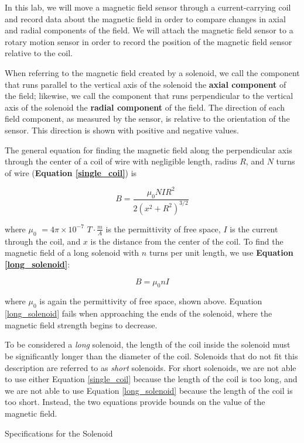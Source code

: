 In this lab, we will move a magnetic field sensor through a current-carrying coil and record data about the magnetic field in order to compare changes in axial and radial components of the field. We will attach the magnetic field sensor to a rotary motion sensor in order to record the position of the magnetic field sensor relative to the coil.

\bigskip
When referring to the magnetic field created by a solenoid, we call the component that runs parallel to the vertical axis of the solenoid the \textbf{axial component} of the field; likewise, we call the component that runs perpendicular to the vertical axis of the solenoid the \textbf{radial component} of the field. The direction of each field component, as measured by the sensor, is relative to the orientation of the sensor. This direction is shown with positive and negative values.

\bigskip
The general equation for finding the magnetic field along the perpendicular axis through the center of a coil of wire with negligible length, radius $R$, and $N$ turns of wire (\textbf{Equation \ref{single_coil}}) is

\begin{equation} \label{single_coil}
B = \frac{\mu_0 N I R^2}{2 ( x^2 + R^2 )^{3/2}}
\end{equation}

where \textbf{$\mu_0$} $= 4 \pi \times 10^{-7}$ $T \cdot \frac{m}{A}$ is the permittivity of free space, \textbf{$I$} is the current through the coil, and \textbf{$x$} is the distance from the center of the coil. To find the magnetic field of a long solenoid with $n$ turns per unit length, we use \textbf{Equation \ref{long_solenoid}}:

\begin{equation} \label{long_solenoid}
B = \mu_0 n I
\end{equation}

where $\mu_0$ is again the permittivity of free space, shown above. Equation \ref{long_solenoid} fails when approaching the ends of the solenoid, where the magnetic field strength begins to decrease.

\bigskip
To be considered a \textit{long} solenoid, the length of the coil inside the solenoid must be significantly longer than the diameter of the coil. Solenoids that do not fit this description are referred to as \textit{short} solenoids. For short solenoids, we are not able to use either Equation \ref{single_coil} because the length of the coil is too long, and we are not able to use Equation \ref{long_solenoid} because the length of the coil is too short. Instead, the two equations provide bounds on the value of the magnetic field.

\bigskip
\begin{minipage}{\textwidth}
    \centering
    Specifications for the Solenoid \\
    \medskip
    
\end{minipage}